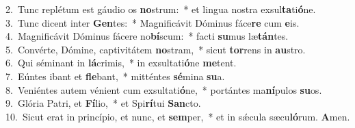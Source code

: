 {2.~}Tunc replétum est gáudio os \textbf{no}strum:~* et lingua nostra exsul\textbf{ta}ti\textbf{ó}ne.\\
{3.~}Tunc dicent inter \textbf{Gen}tes:~* Magnificávit Dóminus fáce\textbf{re} cum \textbf{e}is.\\
{4.~}Magnificávit Dóminus fácere no\textbf{bí}scum:~* facti \textbf{su}mus læ\textbf{tán}tes.\\
{5.~}Convérte, Dómine, captivitátem \textbf{no}stram,~* sicut \textbf{tor}rens in \textbf{au}stro.\\
{6.~}Qui séminant in \textbf{lá}crimis,~* in exsultati\textbf{ó}ne \textbf{me}tent.\\
{7.~}Eúntes ibant et \textbf{fle}bant,~* mitténtes \textbf{sé}mina \textbf{su}a.\\
{8.~}Veniéntes autem vénient cum exsultati\textbf{ó}ne,~* portántes ma\textbf{ní}pulos \textbf{su}os.\\
{9.~}Glória Patri, et \textbf{Fí}lio,~* et Spi\textbf{rí}tui \textbf{San}cto.\\
{10.~}Sicut erat in princípio, et nunc, et \textbf{sem}per,~* et in sǽcula sæcu\textbf{ló}rum. \textbf{A}men.\\
